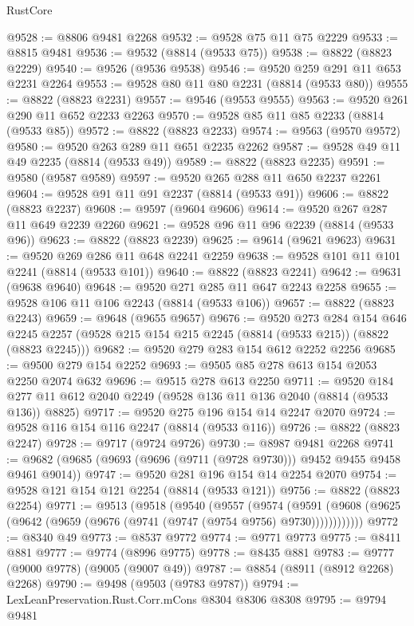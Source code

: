 \begin{lexlean}{RustCore}
\begin{coremodule}
@9528 := @8806 @9481 @2268
@9532 := @9528 @75 @11 @75 @2229
@9533 := @8815 @9481
@9536 := @9532 (@8814 (@9533 @75))
@9538 := @8822 (@8823 @2229)
@9540 := @9526 (@9536 @9538)
@9546 := @9520 @259 @291 @11 @653 @2231 @2264
@9553 := @9528 @80 @11 @80 @2231 (@8814 (@9533 @80))
@9555 := @8822 (@8823 @2231)
@9557 := @9546 (@9553 @9555)
@9563 := @9520 @261 @290 @11 @652 @2233 @2263
@9570 := @9528 @85 @11 @85 @2233 (@8814 (@9533 @85))
@9572 := @8822 (@8823 @2233)
@9574 := @9563 (@9570 @9572)
@9580 := @9520 @263 @289 @11 @651 @2235 @2262
@9587 := @9528 @49 @11 @49 @2235 (@8814 (@9533 @49))
@9589 := @8822 (@8823 @2235)
@9591 := @9580 (@9587 @9589)
@9597 := @9520 @265 @288 @11 @650 @2237 @2261
@9604 := @9528 @91 @11 @91 @2237 (@8814 (@9533 @91))
@9606 := @8822 (@8823 @2237)
@9608 := @9597 (@9604 @9606)
@9614 := @9520 @267 @287 @11 @649 @2239 @2260
@9621 := @9528 @96 @11 @96 @2239 (@8814 (@9533 @96))
@9623 := @8822 (@8823 @2239)
@9625 := @9614 (@9621 @9623)
@9631 := @9520 @269 @286 @11 @648 @2241 @2259
@9638 := @9528 @101 @11 @101 @2241 (@8814 (@9533 @101))
@9640 := @8822 (@8823 @2241)
@9642 := @9631 (@9638 @9640)
@9648 := @9520 @271 @285 @11 @647 @2243 @2258
@9655 := @9528 @106 @11 @106 @2243 (@8814 (@9533 @106))
@9657 := @8822 (@8823 @2243)
@9659 := @9648 (@9655 @9657)
@9676 := @9520
    @273
    @284
    @154
    @646
    @2245
    @2257
    (@9528 @215 @154 @215 @2245 (@8814 (@9533 @215)) (@8822 (@8823 @2245)))
@9682 := @9520 @279 @283 @154 @612 @2252 @2256
@9685 := @9500 @279 @154 @2252
@9693 := @9505 @85 @278 @613 @154 @2053 @2250 @2074 @632
@9696 := @9515 @278 @613 @2250
@9711 := @9520 @184 @277 @11 @612 @2040 @2249 (@9528 @136 @11 @136 @2040 (@8814 (@9533 @136)) @8825)
@9717 := @9520 @275 @196 @154 @14 @2247 @2070
@9724 := @9528 @116 @154 @116 @2247 (@8814 (@9533 @116))
@9726 := @8822 (@8823 @2247)
@9728 := @9717 (@9724 @9726)
@9730 := @8987 @9481 @2268
@9741 := @9682 (@9685 (@9693 (@9696 (@9711 (@9728 @9730))) @9452 @9455 @9458 @9461 @9014))
@9747 := @9520 @281 @196 @154 @14 @2254 @2070
@9754 := @9528 @121 @154 @121 @2254 (@8814 (@9533 @121))
@9756 := @8822 (@8823 @2254)
@9771 := @9513
    (@9518
      (@9540
        (@9557
          (@9574
            (@9591 (@9608 (@9625 (@9642 (@9659 (@9676 (@9741 (@9747 (@9754 @9756) @9730))))))))))))
@9772 := @8340 @49
@9773 := @8537 @9772
@9774 := @9771 @9773
@9775 := @8411 @881
@9777 := @9774 (@8996 @9775)
@9778 := @8435 @881
@9783 := @9777 (@9000 @9778) (@9005 (@9007 @49))
@9787 := @8854 (@8911 (@8912 @2268) @2268)
@9790 := @9498 (@9503 (@9783 @9787))
@9794 := LexLeanPreservation.Rust.Corr.mCons @8304 @8306 @8308
@9795 := @9794 @9481

\end{coremodule}
\end{lexlean}
